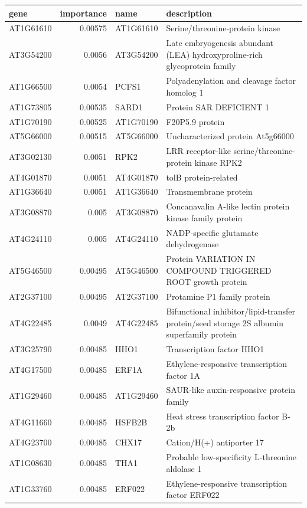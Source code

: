 \documentclass[11pt]{article}
\begin{document}
\begin{center}
\begin{tabular}{lrll}
gene & importance & name & description\\
\hline
AT1G61610 & 0.00575 & AT1G61610 & Serine/threonine-protein kinase\\
AT3G54200 & 0.0056 & AT3G54200 & Late embryogenesis abundant (LEA) hydroxyproline-rich glycoprotein family\\
AT1G66500 & 0.0054 & PCFS1 & Polyadenylation and cleavage factor homolog 1\\
AT1G73805 & 0.00535 & SARD1 & Protein SAR DEFICIENT 1\\
AT1G70190 & 0.00525 & AT1G70190 & F20P5.9 protein\\
AT5G66000 & 0.00515 & AT5G66000 & Uncharacterized protein At5g66000\\
AT3G02130 & 0.0051 & RPK2 & LRR receptor-like serine/threonine-protein kinase RPK2\\
AT4G01870 & 0.0051 & AT4G01870 & tolB protein-related\\
AT1G36640 & 0.0051 & AT1G36640 & Transmembrane protein\\
AT3G08870 & 0.005 & AT3G08870 & Concanavalin A-like lectin protein kinase family protein\\
AT4G24110 & 0.005 & AT4G24110 & NADP-specific glutamate dehydrogenase\\
AT5G46500 & 0.00495 & AT5G46500 & Protein VARIATION IN COMPOUND TRIGGERED ROOT growth protein\\
AT2G37100 & 0.00495 & AT2G37100 & Protamine P1 family protein\\
AT4G22485 & 0.0049 & AT4G22485 & Bifunctional inhibitor/lipid-transfer protein/seed storage 2S albumin superfamily protein\\
AT3G25790 & 0.00485 & HHO1 & Transcription factor HHO1\\
AT4G17500 & 0.00485 & ERF1A & Ethylene-responsive transcription factor 1A\\
AT1G29460 & 0.00485 & AT1G29460 & SAUR-like auxin-responsive protein family\\
AT4G11660 & 0.00485 & HSFB2B & Heat stress transcription factor B-2b\\
AT4G23700 & 0.00485 & CHX17 & Cation/H(+) antiporter 17\\
AT1G08630 & 0.00485 & THA1 & Probable low-specificity L-threonine aldolase 1\\
AT1G33760 & 0.00485 & ERF022 & Ethylene-responsive transcription factor ERF022\\

\end{tabular}
\end{center}
\end{document}
